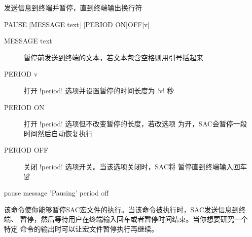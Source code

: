\label{cmd:pause}

发送信息到终端并暂停，直到终端输出换行符

\begin{SACSTX}
PAUSE [MESSAGE text] [PERIOD ON|OFF|v]
\end{SACSTX}

\begin{description}
\item [MESSAGE text] 暂停前发送到终端的文本，若文本包含空格则用引号括起来
\item [PERIOD v] 打开 !period! 选项并设置暂停的时间长度为 !v! 秒
\item [PERIOD ON] 打开 !period! 选项但不改变暂停的长度，若改选项
    为开，SAC会暂停一段时间然后自动恢复执行
\item [PERIOD OFF] 关闭 !period! 选项开关。当该选项关闭时，SAC将
    暂停直到终端输入回车键
\end{description}

\begin{SACDFT}
pause message 'Pausing' period off
\end{SACDFT}

该命令使你能够暂停SAC宏文件的执行。当该命令被执行时，SAC发送信息到终端、
暂停，然后等待用户在终端输入回车或者暂停时间结束。当你想要研究一个特定
命令的输出时可以让宏文件暂停执行再继续。
